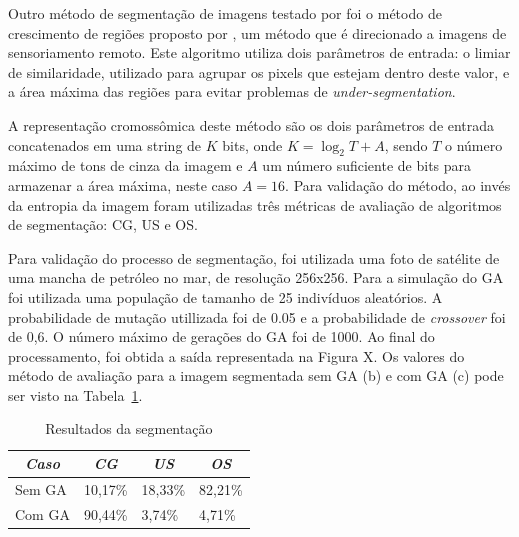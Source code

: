 \documentclass[12pt,oneside,a4paper,english,french,spanish,brazil,]{abntex2}
\begin{document}

Outro método de segmentação de imagens testado por \citet{matias:2007} foi o método de crescimento de regiões proposto por \citet{bins:1996}, um método que é direcionado a imagens de sensoriamento remoto. Este algoritmo utiliza dois parâmetros de entrada: o limiar de similaridade, utilizado para agrupar os pixels que estejam dentro deste valor, e a área máxima das regiões para evitar problemas de \textit{under-segmentation}.


A representação cromossômica deste método são os dois parâmetros de entrada concatenados em uma string de \(K\) bits, onde \(K = \log_2 T + A\), sendo \(T\) o número máximo de tons de cinza da imagem e \(A\) um número suficiente de bits para armazenar a área máxima, neste caso \(A = 16\). Para validação do método, ao invés da entropia da imagem foram utilizadas três métricas de avaliação de algoritmos de segmentação: CG, US e OS.

Para validação do processo de segmentação, foi utilizada uma foto de satélite de uma mancha de petróleo no mar, de resolução 256x256. Para a simulação do GA foi utilizada uma população de tamanho de 25 indivíduos aleatórios. A probabilidade de mutação utillizada foi de 0.05 e a probabilidade de \textit{crossover} foi de 0,6. O número máximo de gerações do GA foi de 1000. Ao final do processamento, foi obtida a saída representada na Figura X. Os valores do método de avaliação para a imagem segmentada sem GA (b) e com GA (c) pode ser visto na Tabela~\ref{tab:TrCo_Matias_1}.


\begin{table}[]
\centering
\caption{Resultados da segmentação}
\label{tab:TrCo_Matias_1}
\begin{tabular}{llll}
\hline
\multicolumn{1}{c}{\textit{\textbf{Caso}}} & \multicolumn{1}{c}{\textit{\textbf{CG}}} & \multicolumn{1}{c}{\textit{\textbf{US}}} & \multicolumn{1}{c}{\textit{\textbf{OS}}} \\ \hline
Sem GA                                     & 10,17\%                                  & 18,33\%                                  & 82,21\%                                  \\ \hline
Com GA                                     & 90,44\%                                  & 3,74\%                                   & 4,71\%                                   \\ \hline
\end{tabular}
\end{table}
\end{document}
